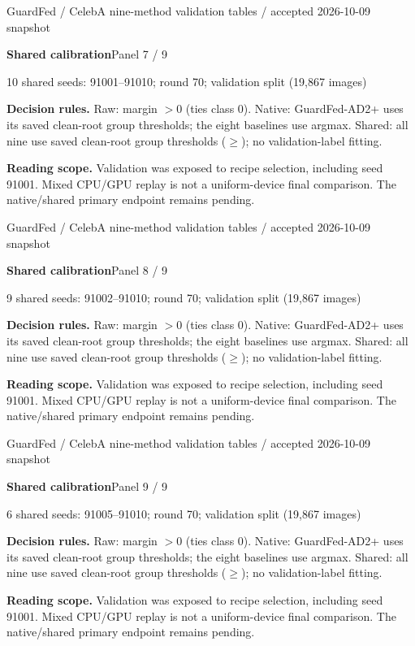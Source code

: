 \documentclass[11pt]{article}
\begin{document}
\newpage
{\small GuardFed / CelebA nine-method validation tables / accepted 2026-10-09 snapshot}\par\medskip
{\LARGE\bfseries Shared calibration}\hfill{\large Panel 7 / 9}\par\smallskip
{\large 10 shared seeds: 91001--91010; round 70; validation split (19,867 images)}\par\medskip

\par\medskip
{\footnotesize\textbf{Decision rules.} Raw: margin $>0$ (ties class 0). Native: GuardFed-AD2+ uses its saved clean-root group thresholds; the eight baselines use argmax. Shared: all nine use saved clean-root group thresholds ($\geq$); no validation-label fitting.\par
\textbf{Reading scope.} Validation was exposed to recipe selection, including seed 91001. Mixed CPU/GPU replay is not a uniform-device final comparison. The native/shared primary endpoint remains pending.}

\newpage
{\small GuardFed / CelebA nine-method validation tables / accepted 2026-10-09 snapshot}\par\medskip
{\LARGE\bfseries Shared calibration}\hfill{\large Panel 8 / 9}\par\smallskip
{\large 9 shared seeds: 91002--91010; round 70; validation split (19,867 images)}\par\medskip

\par\medskip
{\footnotesize\textbf{Decision rules.} Raw: margin $>0$ (ties class 0). Native: GuardFed-AD2+ uses its saved clean-root group thresholds; the eight baselines use argmax. Shared: all nine use saved clean-root group thresholds ($\geq$); no validation-label fitting.\par
\textbf{Reading scope.} Validation was exposed to recipe selection, including seed 91001. Mixed CPU/GPU replay is not a uniform-device final comparison. The native/shared primary endpoint remains pending.}

\newpage
{\small GuardFed / CelebA nine-method validation tables / accepted 2026-10-09 snapshot}\par\medskip
{\LARGE\bfseries Shared calibration}\hfill{\large Panel 9 / 9}\par\smallskip
{\large 6 shared seeds: 91005--91010; round 70; validation split (19,867 images)}\par\medskip

\par\medskip
{\footnotesize\textbf{Decision rules.} Raw: margin $>0$ (ties class 0). Native: GuardFed-AD2+ uses its saved clean-root group thresholds; the eight baselines use argmax. Shared: all nine use saved clean-root group thresholds ($\geq$); no validation-label fitting.\par
\textbf{Reading scope.} Validation was exposed to recipe selection, including seed 91001. Mixed CPU/GPU replay is not a uniform-device final comparison. The native/shared primary endpoint remains pending.}
\end{document}
